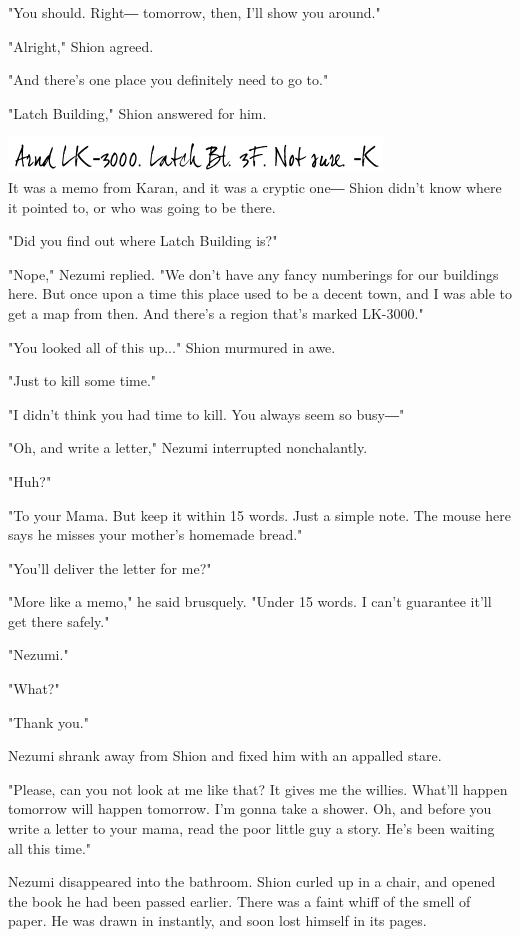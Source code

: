 "You should. Right― tomorrow, then, I'll show you around."

"Alright," Shion agreed.

"And there's one place you definitely need to go to."

"Latch Building," Shion answered for him.

\includegraphics{Images/memo1.png}\\

It was a memo from Karan, and it was a cryptic one― Shion didn't know
where it pointed to, or who was going to be there.

"Did you find out where Latch Building is?"

"Nope," Nezumi replied. "We don't have any fancy numberings for our
buildings here. But once upon a time this place used to be a decent
town, and I was able to get a map from then. And there's a region that's
marked LK-3000."

"You looked all of this up..." Shion murmured in awe.

"Just to kill some time."

"I didn't think you had time to kill. You always seem so busy―"

"Oh, and write a letter," Nezumi interrupted nonchalantly.

"Huh?"

"To your Mama. But keep it within 15 words. Just a simple note. The
mouse here says he misses your mother's homemade bread."

"You'll deliver the letter for me?"

"More like a memo," he said brusquely. "Under 15 words. I can't
guarantee it'll get there safely."

"Nezumi."

"What?"

"Thank you."

Nezumi shrank away from Shion and fixed him with an appalled stare.

"Please, can you not look at me like that? It gives me the willies.
What'll happen tomorrow will happen tomorrow. I'm gonna take a shower.
Oh, and before you write a letter to your mama, read the poor little guy
a story. He's been waiting all this time."

Nezumi disappeared into the bathroom. Shion curled up in a chair, and
opened the book he had been passed earlier. There was a faint whiff of
the smell of paper. He was drawn in instantly, and soon lost himself in
its pages.

